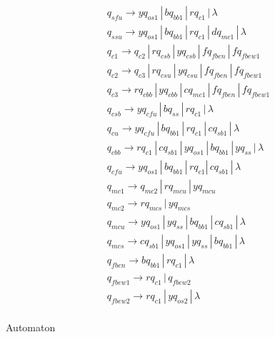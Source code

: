 \documentclass{article}
\begin{document}
\begin{mylist}
\begin{align*}
&q_{sfu} \rightarrow yq_{os1} \, | \, bq_{bb1} \, | \, rq_{c1} \, | \, \lambda\\ 
&q_{ssu} \rightarrow yq_{os1} \, | \, bq_{bb1} \, | \, rq_{c1} \, | \, dq_{mc1}\, | \, \lambda\\ 
&q_{c1} \rightarrow q_{c2} \, | \,  rq_{csb} \, | \, yq_{csb} \, | \, fq_{fben} \, | \, fq_{fbew1}\\ 
&q_{c2} \rightarrow q_{c3} \, | \,  rq_{csu} \, | \, yq_{csu} \, | \, fq_{fben} \, | \, fq_{fbew1}\\ 
&q_{c3} \rightarrow rq_{cbb} \, | \,  yq_{cbb} \, | \, cq_{mc1} \, | \, fq_{fben} \, | \, fq_{fbew1}\ \\ 
&q_{csb} \rightarrow yq_{cfu} \, | \,  bq_{ss} \, | \, rq_{c1} \, | \, \lambda \\ 
&q_{cu} \rightarrow yq_{cfu} \, | \,  bq_{bb1} \, | \, rq_{c1} \, | \, cq_{sb1} \, | \, \lambda \\ 
&q_{cbb} \rightarrow rq_{c1} \, | \,  cq_{sb1} \, | \, yq_{os1} \, | \, bq_{bb1} \, | \, yq_{ss} \, | \, \lambda \\ 
&q_{cfu} \rightarrow yq_{os1} \, | \,  bq_{bb1} \, | \, rq_{c1} | \, cq_{sb1} \, | \, \lambda\\ 
&q_{mc1} \rightarrow q_{mc2} \, | \, rq_{mcu} \, | \, yq_{mcu}\\
&q_{mc2} \rightarrow rq_{mcs} \, | \, yq_{mcs}\\
&q_{mcu} \rightarrow yq_{os1} \, | \, yq_{ss} \, | \, bq_{bb1} \, | \, cq_{sb1} \, | \, \lambda\\
&q_{mcs} \rightarrow cq_{sb1} \, | \, yq_{os1} \, | \, yq_{ss} \, | \, bq_{bb1}\, | \, \lambda\\
&q_{fben} \rightarrow bq_{bb1} \, | \, rq_{c1} \, | \, \lambda\\
&q_{fbew1} \rightarrow rq_{c1} \, | \, q_{fbew2} \\
&q_{fbew2} \rightarrow rq_{c1} \, | \, yq_{os2} \, | \, \lambda\\
\end{align*}

\newpage
{}
\item Automaton

\begin{center}


\end{center}
\end{mylist}
\end{document}
